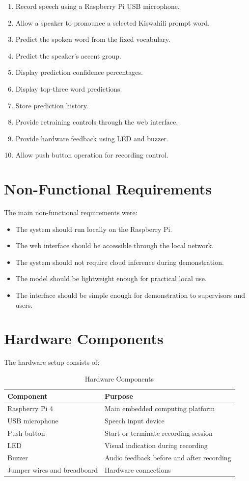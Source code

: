 \documentclass[12pt,a4paper]{report}
\begin{document}
\begin{enumerate}
    \item Record speech using a Raspberry Pi USB microphone.
    \item Allow a speaker to pronounce a selected Kiswahili prompt word.
    \item Predict the spoken word from the fixed vocabulary.
    \item Predict the speaker's accent group.
    \item Display prediction confidence percentages.
    \item Display top-three word predictions.
    \item Store prediction history.
    \item Provide retraining controls through the web interface.
    \item Provide hardware feedback using LED and buzzer.
    \item Allow push button operation for recording control.
\end{enumerate}

\section{Non-Functional Requirements}
The main non-functional requirements were:

\begin{itemize}
    \item The system should run locally on the Raspberry Pi.
    \item The web interface should be accessible through the local network.
    \item The system should not require cloud inference during demonstration.
    \item The model should be lightweight enough for practical local use.
    \item The interface should be simple enough for demonstration to supervisors and users.
\end{itemize}

\section{Hardware Components}
The hardware setup consists of:

\begin{table}[h]
\centering
\caption{Hardware Components}
\begin{tabular}{ll}
\toprule
\textbf{Component} & \textbf{Purpose} \\
\midrule
Raspberry Pi 4 & Main embedded computing platform \\
USB microphone & Speech input device \\
Push button & Start or terminate recording session \\
LED & Visual indication during recording \\
Buzzer & Audio feedback before and after recording \\
Jumper wires and breadboard & Hardware connections \\
\bottomrule
\end{tabular}
\end{table}
\end{document}
